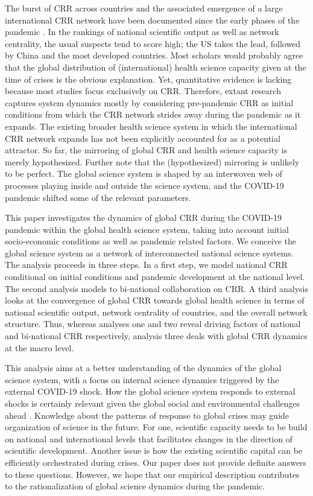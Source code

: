 The burst of CRR across countries and the associated emergence of a large international CRR network have been documented since the early phases of the pandemic \citep{aviv2021publication,cai2021international,chahrour2020bibliometric,fry2020consolidation,haghani2020covid,radanliev2020country,zhang2020scientific}. In the rankings of national scientific output as well as network centrality, the usual suspects tend to score high; the US takes the lead, followed by China and the most developed countries. Most scholars would probably agree that the global distribution of (international) health science capacity given at the time of crises is the obvious explanation. Yet, quantitative evidence is lacking because most studies focus exclusively on CRR. Therefore, extant research captures system dynamics mostly by considering pre-pandemic CRR as initial conditions from which the CRR network strides away during the pandemic as it expands. The existing broader health science system in which the international CRR network expands has not been explicitly accounted for as a potential attractor. So far, the mirroring of global CRR and health science capacity is merely hypothesized. Further note that the (hypothesized) mirroring is unlikely to be perfect. The global science system is shaped by an interwoven web of processes playing inside and outside the science system, and the COVID-19 pandemic shifted some of the relevant parameters. 

This paper investigates the dynamics of global CRR during the COVID-19 pandemic within the global health science system, taking into account initial socio-economic conditions as well as pandemic related factors. We conceive the global science system as a network of interconnected national science systems. The analysis proceeds in three steps. In a first step, we model national CRR conditional on initial conditions and pandemic development at the national level. The second analysis models to bi-national collaboration on CRR. A third analysis looks at the convergence of global CRR towards global health science in terms of national scientific output, network centrality of countries, and the overall network structure. Thus, whereas analyses one and two reveal driving factors of national and bi-national CRR respectively, analysis three deals with global CRR dynamics at the macro level.

This analysis aims at a better understanding of the dynamics of the global science system, with a focus on internal science dynamics triggered by the external COVID-19 shock. How the global science system responds to external shocks is certainly relevant given the global social and environmental challenges ahead \citep{schot2018three}. Knowledge about the patterns of response to global crises may guide organization of science in the future. For one, scientific capacity needs to be build on national and international levels that facilitates changes in the direction of scientific development. Another issue is how the existing scientific capital can be efficiently orchestrated during crises. Our paper does not provide definite answers to these questions. However, we hope that our empirical description contributes to the rationalization of global science dynamics during the pandemic.

